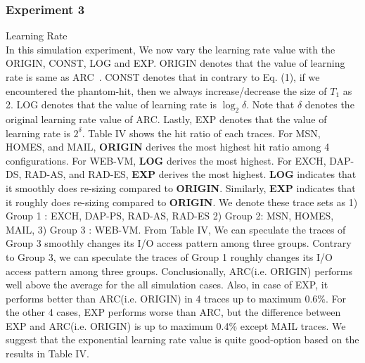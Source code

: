 \subsubsection{Experiment 3} Learning Rate \\
In this simulation experiment, We now vary the learning rate value with the ORIGIN, CONST, LOG and EXP. ORIGIN denotes that the value of learning rate is same as ARC~\cite{arc}. CONST denotes that in contrary to Eq. (1), if we encountered the phantom-hit, then we always increase/decrease the size of $T_1$ as 2.  LOG denotes that the value of learning rate is $\log_2{\delta}$. Note that $\delta$ denotes the original learning rate value of ARC. Lastly, EXP denotes that the value of learning rate is $2^\delta$. Table IV shows the hit ratio of each traces. For MSN, HOMES, and MAIL, \textbf{ORIGIN} derives the most highest hit ratio among 4 configurations. For WEB-VM, \textbf{LOG} derives the most highest. For EXCH, DAP-DS, RAD-AS, and RAD-ES, \textbf{EXP} derives the most highest. \textbf{LOG} indicates that it smoothly does re-sizing compared to \textbf{ORIGIN}. Similarly, \textbf{EXP} indicates that it roughly does re-sizing compared to \textbf{ORIGIN}. We denote these trace sets as 1) Group 1 : EXCH, DAP-PS, RAD-AS, RAD-ES 2) Group 2: MSN, HOMES, MAIL, 3) Group 3 : WEB-VM. From Table IV, We can speculate the traces of Group 3 smoothly changes its I/O access pattern among three groups. Contrary to Group 3, we can speculate the traces of Group 1 roughly changes its I/O access pattern among three groups. Conclusionally, ARC(i.e. ORIGIN) performs well above the average for the all simulation cases. Also, in case of EXP, it performs better than ARC(i.e. ORIGIN) in 4 traces up to maximum 0.6\%. For the other 4 cases, EXP performs worse than ARC, but the difference between EXP and ARC(i.e. ORIGIN) is up to maximum 0.4\% except MAIL traces. We suggest that the exponential learning rate value is quite good-option based on the results in Table IV. 

